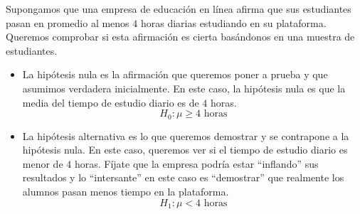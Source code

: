 \documentclass[
  letterpaper,
  DIV=11,
  numbers=noendperiod]{scrreprt}
\begin{document}
\begin{tcolorbox}[enhanced jigsaw, arc=.35mm, breakable, coltitle=black, left=2mm, opacityback=0, bottomtitle=1mm, colbacktitle=quarto-callout-tip-color!10!white, title=\textcolor{quarto-callout-tip-color}{\faLightbulb}\hspace{0.5em}{Ejemplo \(H_0\) vs \(H_1\). Media poblacional}, titlerule=0mm, colback=white, colframe=quarto-callout-tip-color-frame, bottomrule=.15mm, rightrule=.15mm, opacitybacktitle=0.6, toptitle=1mm, toprule=.15mm, leftrule=.75mm]

Supongamos que una empresa de educación en línea afirma que sus
estudiantes pasan en promedio al menos \(4\) horas diarias estudiando en
su plataforma. Queremos comprobar si esta afirmación es cierta
basándonos en una muestra de estudiantes.

\begin{itemize}
\item
  La hipótesis nula es la afirmación que queremos poner a prueba y que
  asumimos verdadera inicialmente. En este caso, la hipótesis nula es
  que la media del tiempo de estudio diario es de \(4\) horas. \[
   H_0: \mu \geq 4 \text{ horas}
   \]
\item
  La hipótesis alternativa es lo que queremos demostrar y se contrapone
  a la hipótesis nula. En este caso, queremos ver si el tiempo de
  estudio diario es menor de \(4\) horas. Fíjate que la empresa podría
  estar ``inflando'' sus resultados y lo ``intersante'' en este caso es
  ``demostrar'' que realmente los alumnos pasan menos tiempo en la
  plataforma. \[
   H_1: \mu < 4 \text{ horas}
  \]
\end{itemize}

\end{tcolorbox}
\end{document}
